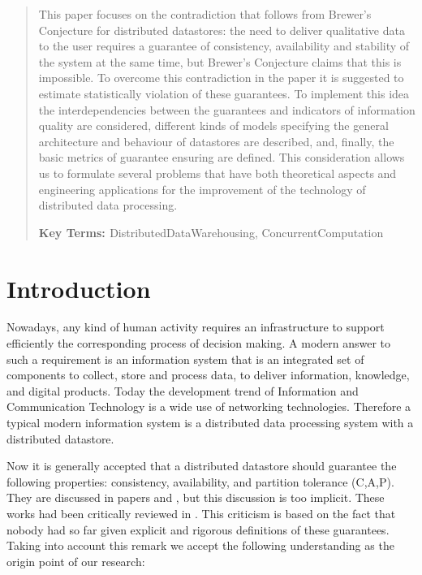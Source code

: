 \documentclass{llncs}
\newcommand{\keyterms}[1]{\par{\bfseries{ Key Terms: }}#1}
\begin{document}
\begin{abstract}

This paper focuses on the contradiction that follows from Brewer's Conjecture for distributed
datastores: the need to deliver qualitative data to the user requires a guarantee of consistency,
availability and stability of the system at the same time, but Brewer's Conjecture claims that
this is impossible.
To overcome this contradiction in the paper it is suggested to estimate statistically violation
of these guarantees.
To implement this idea the interdependencies between the guarantees and indicators of information
quality are considered, different kinds of models specifying the general architecture and behaviour of
datastores are described, and, finally, the basic metrics of guarantee ensuring are defined.
This conside\-ration allows us to formulate several problems that have both theoretical aspects
and engineering applications for the improvement of the technology of distributed data processing.
\keyterms{DistributedDataWarehousing, ConcurrentComputation}
\end{abstract}
\section{Introduction}\label{sec:intro}

Nowadays, any kind of human activity requires an infrastructure to support efficiently
the corresponding process of decision making.
A modern answer to such a requirement is an information system that is an integrated set of
components to collect, store and process data, to deliver information, knowledge, and digital
products.
Today the development trend of Information and Communication Technology is a wide use of networking technologies.
Therefore a typical modern information system is a distributed data processing system with
a distributed datastore.

Now it is generally accepted that a distributed datastore should guarantee 
the following properties: consistency, availability, and partition tolerance (C,A,P). 
They are discussed in papers \cite{bib:cap} and \cite{bib:cap_review}, but this discussion is too implicit. 
These works had been critically reviewed in \cite{bib:cap_critic}. 
This criticism is based on the fact that nobody had so far given explicit and rigorous definitions
of these guarantees. 
Taking into account this remark we accept the following understanding as the origin point of our
research:
\end{document}
